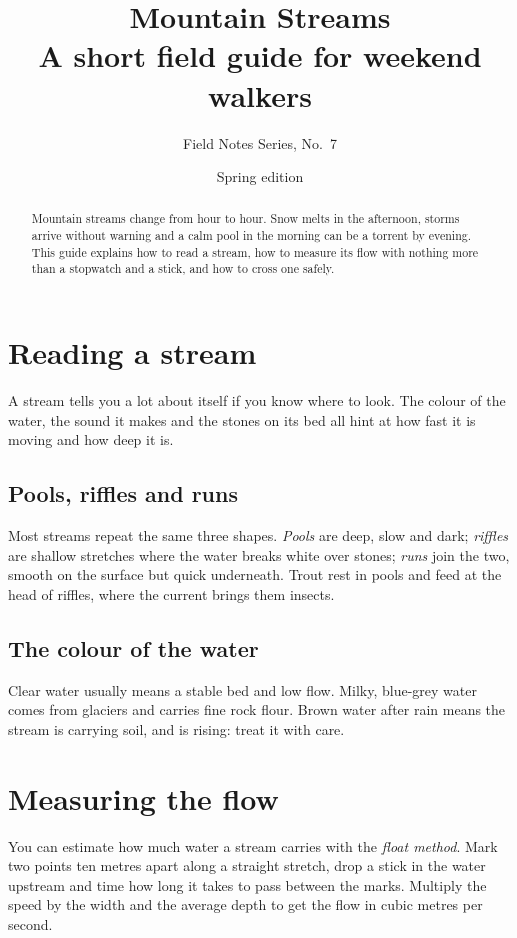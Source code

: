 \documentclass[11pt]{article}
\title{\textbf{Mountain Streams}\\[4pt]\large A short field guide for weekend walkers}
\author{Field Notes Series, No.~7}
\date{Spring edition}
\begin{document}
\maketitle

\begin{abstract}
Mountain streams change from hour to hour. Snow melts in the afternoon, storms
arrive without warning and a calm pool in the morning can be a torrent by
evening. This guide explains how to read a stream, how to measure its flow with
nothing more than a stopwatch and a stick, and how to cross one safely.
\end{abstract}

\tableofcontents

\section{Reading a stream}

A stream tells you a lot about itself if you know where to look. The colour of
the water, the sound it makes and the stones on its bed all hint at how fast it
is moving and how deep it is.

\subsection{Pools, riffles and runs}

Most streams repeat the same three shapes. \emph{Pools} are deep, slow and dark;
\emph{riffles} are shallow stretches where the water breaks white over stones;
\emph{runs} join the two, smooth on the surface but quick underneath. Trout rest
in pools and feed at the head of riffles, where the current brings them insects.

\subsection{The colour of the water}

Clear water usually means a stable bed and low flow. Milky, blue-grey water
comes from glaciers and carries fine rock flour. Brown water after rain means
the stream is carrying soil, and is rising: treat it with care.

\section{Measuring the flow}

You can estimate how much water a stream carries with the \emph{float method}.
Mark two points ten metres apart along a straight stretch, drop a stick in the
water upstream and time how long it takes to pass between the marks. Multiply
the speed by the width and the average depth to get the flow in cubic metres per
second.
\end{document}
